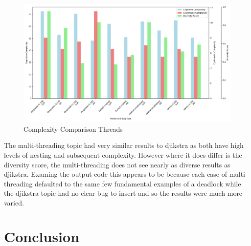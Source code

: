 \documentclass[12pt]{extarticle}
\begin{document}
\begin{figure}[h!]
\centering
\includegraphics[width=0.8\linewidth]{Images/Complexity_Comparison_Threads.png}
\caption{Complexity Comparison Threads}
\label{fig:Complexity_Comparison_Threads}
\end{figure}

The multi-threading topic had very similar results to djikstra as both have high levels of nesting and subsequent complexity. However where it does differ is the diversity score, the multi-threading does not see nearly as diverse results as djikstra. Examing the output code this appears to be because each case of multi-threading defaulted to the same few fundamental examples of a deadlock while the djikstra topic had no clear bug to insert and so the results were much more varied.



\newpage
\section{Conclusion}
\end{document}
